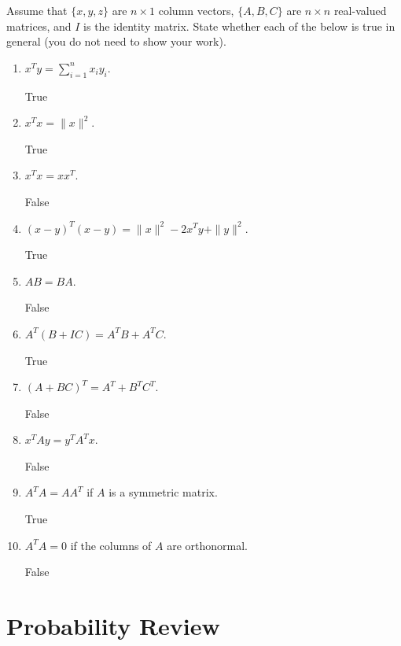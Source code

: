 \documentclass{article}
\def\blu#1{{\color{blu}#1}}
\def\norm#1{\|#1\|}
\begin{document}
Assume that $\{x,y,z\}$ are $n \times 1$ column vectors, $\{A,B,C\}$ are $n \times n$ real-valued matrices, and $I$ is the identity matrix. \blu{State whether each of the below is true in general} (you do not need to show your work).

\begin{enumerate}
\item $x^Ty = \sum_{i=1}^n x_iy_i$.
\begin{center}\color{blu} True \end{center}
\item $x^Tx = \norm{x}^2$.
\begin{center}\color{blu} True \end{center}
\item $x^Tx = xx^T$.
\begin{center}\color{blu} False \end{center}
\item $(x-y)^T(x-y) = \norm{x}^2 - 2x^Ty + \norm{y}^2$.
\begin{center}\color{blu} True \end{center}
\item $AB=BA$.
\begin{center}\color{blu} False \end{center}
\item $A^T(B + IC) = A^TB + A^TC$.
\begin{center}\color{blu} True \end{center}
\item $(A + BC)^T = A^T + B^TC^T$.
\begin{center}\color{blu} False \end{center}
\item $x^TAy = y^TA^Tx$.
\begin{center}\color{blu} False \end{center}
\item $A^TA = AA^T$ if $A$ is a symmetric matrix.
\begin{center}\color{blu} True \end{center}
\item $A^TA = 0$ if the columns of $A$ are orthonormal.
\begin{center}\color{blu} False \end{center}
\end{enumerate}

\section{Probability Review}
\end{document}
